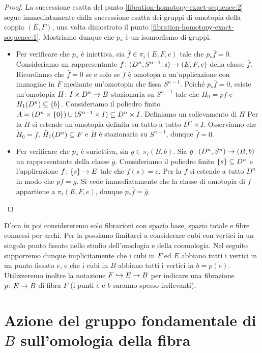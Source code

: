 \begin{proof}
La successione esatta del punto \ref{fibration-homotopy-exact-sequence:2} segue immediatamente dalla successione esatta dei gruppi di omotopia della coppia $(E,F)$, una volta dimostrato il punto \ref{fibration-homotopy-exact-sequence:1}. Mostriamo dunque che $p_*$ è un isomorfismo di gruppi.
\begin{itemize}
\item Per verificare che $p_*$ è iniettiva, sia $\bar{f}\in\pi_i(E,F,e)$ tale che $p_*\bar{f}=0$. Consideriamo un rappresentante $f\colon(D^n,S^{n-1},s)\to(E,F,e)$ della classe $\bar{f}$. Ricordiamo che $\bar{f}=0$ se e solo se $f$ è omotopa a un'applicazione con immagine in $F$ mediante un'omotopia che fissa $S^{n-1}$. Poiché $p_*\bar{f}=0$, esiste un'omotopia $H\colon I\times D^n\to B$ stazionaria su $S^{n-1}$ tale che $H_0=pf$ e $H_1(D^n)\subseteq\{b\}$. Consideriamo il poliedro finito $A=(D^n\times\{0\})\cup(S^{n-1}\times I)\subseteq D^n\times I$. Definiamo un sollevamento di $H$
Per la  $\tilde{H}$ si estende un'omotopia definita su tutto a tutto $D^n\times I$. Osserviamo che $\tilde{H}_0=f$, $\tilde{H}_1(D^n)\subseteq F$ e $\tilde{H}$ è stazionaria su $S^{n-1}$, dunque $\bar{f}=0$.
\item Per verificare che $p_*$ è suriettiva, sia $\bar{g}\in\pi_i(B,b)$. Sia $g\colon(D^n,S^n)\to(B,b)$ un rappresentante della classe $\bar{g}$. Consideriamo il poliedro finito $\{s\}\subseteq D^n$ e l'applicazione $f\colon\{s\}\to E$ tale che $f(s)=e$. Per la  $f$ si estende a tutto $D^n$ in modo che $pf=g$. Si vede immediatamente che la classe di omotopia di $f$ appartiene a $\pi_i(E,F,e)$, dunque $p_*\bar{f}=\bar{g}$.
\end{itemize}
\end{proof}

D'ora in poi considereremo solo fibrazioni con spazio base, spazio totale e fibre connessi per archi. Per la  possiamo limitarci a considerare cubi con vertici in un singolo punto fissato nello studio dell'omologia e della coomologia. Nel seguito supporremo dunque implicitamente che i cubi in $F$ ed $E$ abbiano tutti i vertici in un punto fissato $e$, e che i cubi in $B$ abbiano tutti i vertici in $b=p(e)$. Utilizzeremo inoltre la notazione $F\hookrightarrow E\to B$ per indicare una fibrazione $p\colon E\to B$ di fibra $F$ (i punti $e$ e $b$ saranno spesso irrilevanti).

\section{Azione del gruppo fondamentale di \texorpdfstring{$B$}{B} sull'omologia della fibra}

